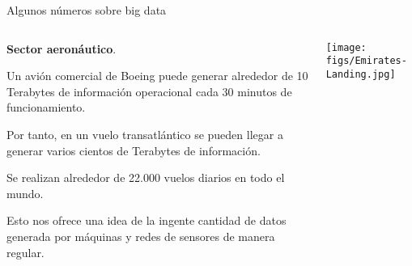 \begin{frame}{Algunos números sobre big data}
 \begin{columns}[T]
    \begin{column}{.7\textwidth}
    \begin{wideitemize}
     \item \textbf{Sector aeronáutico}.
     \item Un avión comercial de Boeing puede generar alrededor de 10 Terabytes
     de información operacional cada 30 minutos de funcionamiento.
     \item Por tanto, en un vuelo transatlántico se pueden llegar a generar
     varios cientos de Terabytes de información.
     \item Se realizan alrededor de 22.000 vuelos diarios en todo el mundo.
     \item Esto nos ofrece una idea de la ingente cantidad de datos generada
     por máquinas y redes de sensores de manera regular.

    \end{wideitemize}

    \end{column}
    \begin{column}{.3\textwidth}
    \vspace*{2cm}
    \hspace*{-0.5cm}
    \texttt{[image: figs/Emirates-Landing.jpg]}
    \end{column}
  \end{columns}

\end{frame}


